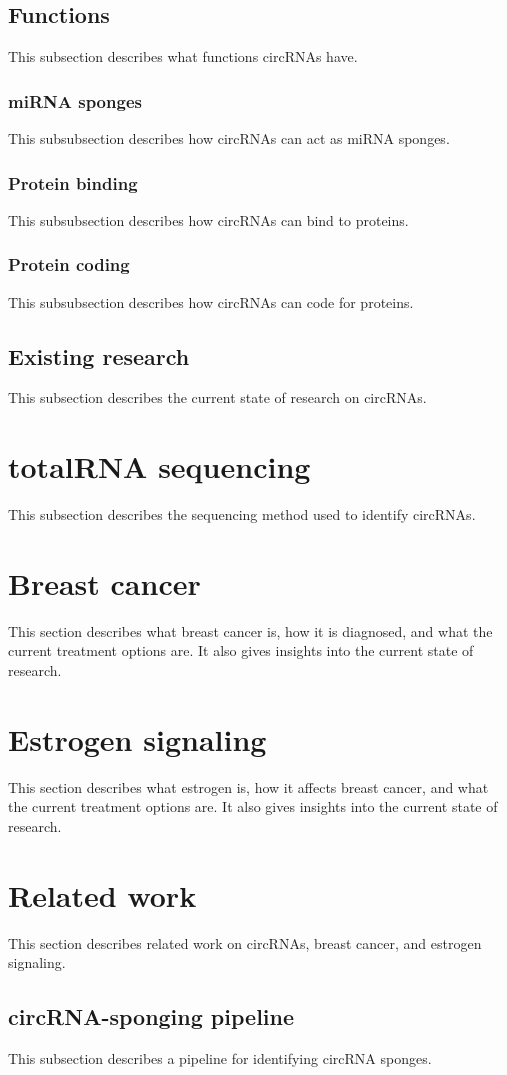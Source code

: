 \subsection{Functions}
This subsection describes what functions circRNAs have.

\subsubsection{miRNA sponges}
This subsubsection describes how circRNAs can act as miRNA sponges.

\subsubsection{Protein binding}
This subsubsection describes how circRNAs can bind to proteins.

\subsubsection{Protein coding}
This subsubsection describes how circRNAs can code for proteins.

\subsection{Existing research}
This subsection describes the current state of research on circRNAs.

\section{totalRNA sequencing}
This subsection describes the sequencing method used to identify circRNAs.

\lipsum[2]

\section{Breast cancer}
This section describes what breast cancer is, how it is diagnosed, and what the current treatment options are.
It also gives insights into the current state of research.

\lipsum[3]

\section{Estrogen signaling}
This section describes what estrogen is, how it affects breast cancer, and what the current treatment options are.
It also gives insights into the current state of research.

\lipsum[4]

\section{Related work}
This section describes related work on circRNAs, breast cancer, and estrogen signaling.

\subsection{circRNA-sponging pipeline}
This subsection describes a pipeline for identifying circRNA sponges.